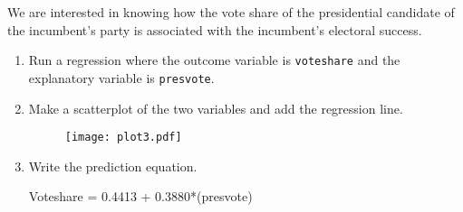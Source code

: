 \documentclass[12pt,letterpaper]{article}
\begin{document}
\noindent We are interested in knowing how the vote share of the presidential candidate of the incumbent's party is associated with the incumbent's electoral success.
	\vspace{.25cm}
	\begin{enumerate}
		\item Run a regression where the outcome variable is \texttt{voteshare} and the explanatory variable is \texttt{presvote}.
			
				
			
			
			
		\item Make a scatterplot of the two variables and add the regression line. 
			
				
			\begin{figure}[h!]\centering
				
				\texttt{[image: plot3.pdf]}
				
			\end{figure}
			
			
			
		\item Write the prediction equation.
			
			
			Voteshare =  0.4413 + 0.3880*(presvote)
		
		
	\end{enumerate}
	

\newpage	
\end{document}
